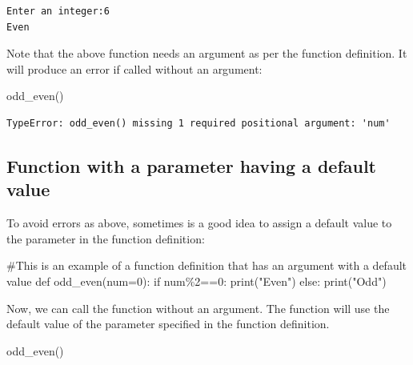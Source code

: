 \documentclass[
  letterpaper,
  DIV=11,
  numbers=noendperiod]{scrreprt}
\newenvironment{Shaded}{\begin{snugshade}}{\end{snugshade}}
\newcommand{\BuiltInTok}[1]{\textcolor[rgb]{0.00,0.23,0.31}{#1}}
\newcommand{\CommentTok}[1]{\textcolor[rgb]{0.37,0.37,0.37}{#1}}
\newcommand{\ControlFlowTok}[1]{\textcolor[rgb]{0.00,0.23,0.31}{#1}}
\newcommand{\DecValTok}[1]{\textcolor[rgb]{0.68,0.00,0.00}{#1}}
\newcommand{\KeywordTok}[1]{\textcolor[rgb]{0.00,0.23,0.31}{#1}}
\newcommand{\NormalTok}[1]{\textcolor[rgb]{0.00,0.23,0.31}{#1}}
\newcommand{\OperatorTok}[1]{\textcolor[rgb]{0.37,0.37,0.37}{#1}}
\newcommand{\StringTok}[1]{\textcolor[rgb]{0.13,0.47,0.30}{#1}}
\begin{document}
\begin{verbatim}
Enter an integer:6
Even
\end{verbatim}

Note that the above function needs an argument as per the function
definition. It will produce an error if called without an argument:

\begin{Shaded}
\begin{Highlighting}[]
\NormalTok{odd\_even()}
\end{Highlighting}
\end{Shaded}

\begin{verbatim}
TypeError: odd_even() missing 1 required positional argument: 'num'
\end{verbatim}

\hypertarget{function-with-a-parameter-having-a-default-value}{%
\subsection{Function with a parameter having a default
value}\label{function-with-a-parameter-having-a-default-value}}

To avoid errors as above, sometimes is a good idea to assign a default
value to the parameter in the function definition:

\begin{Shaded}
\begin{Highlighting}[]
\CommentTok{\#This is an example of a function definition that has an argument with a default value}
\KeywordTok{def}\NormalTok{ odd\_even(num}\OperatorTok{=}\DecValTok{0}\NormalTok{):           }
    \ControlFlowTok{if}\NormalTok{ num}\OperatorTok{\%}\DecValTok{2}\OperatorTok{==}\DecValTok{0}\NormalTok{:}
        \BuiltInTok{print}\NormalTok{(}\StringTok{"Even"}\NormalTok{)}
    \ControlFlowTok{else}\NormalTok{:}
        \BuiltInTok{print}\NormalTok{(}\StringTok{"Odd"}\NormalTok{)}
\end{Highlighting}
\end{Shaded}

Now, we can call the function without an argument. The function will use
the default value of the parameter specified in the function definition.

\begin{Shaded}
\begin{Highlighting}[]
\NormalTok{odd\_even()}
\end{Highlighting}
\end{Shaded}
\end{document}
